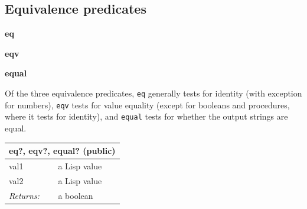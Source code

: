 \documentclass[twoside,9pt]{report}
\begin{document}
\subsection{Equivalence predicates}
\label{equivalence-predicates}

\textbf{eq}


\textbf{eqv}


\textbf{equal}


Of the three equivalence predicates, \texttt{eq} generally tests for identity (with exception for numbers), \texttt{eqv} tests for value equality (except for booleans and procedures, where it tests for identity), and \texttt{equal} tests for whether the output strings are equal.

\begin{tabular}{ |l l| }
\hline
\multicolumn{2}{|l|}{eq?, eqv?, equal? (public)} \\
\hline
val1 & a Lisp value \\
val2 & a Lisp value \\
\textit{Returns:} & a boolean \\
\hline
\end{tabular}
\end{document}
